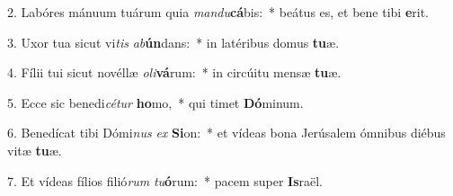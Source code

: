 2. Labóres mánuum tuárum quia \textit{man}\textit{du}\textbf{cá}bis:~*  beátus es, et bene tibi \textbf{e}rit.\

3. Uxor tua sicut vi\textit{tis} \textit{ab}\textbf{ún}dans:~*  in latéribus domus \textbf{tu}æ.\

4. Fílii tui sicut novéllæ \textit{o}\textit{li}\textbf{vá}rum:~*  in circúitu mensæ \textbf{tu}æ.\

5. Ecce sic benedi\textit{cé}\textit{tur} \textbf{ho}mo,~*  qui timet \textbf{Dó}minum.\

6. Benedícat tibi Dómi\textit{nus} \textit{ex} \textbf{Si}on:~*  et vídeas bona Jerúsalem ómnibus diébus vitæ \textbf{tu}æ.\

7. Et vídeas fílios filió\textit{rum} \textit{tu}\textbf{ó}rum:~*  pacem super \textbf{Is}raël.\

